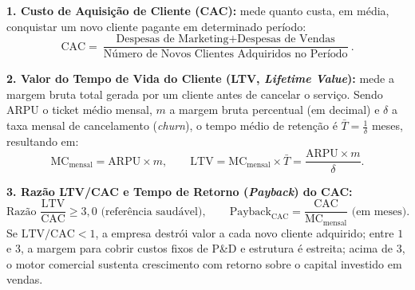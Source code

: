 \begin{boxFormula}
  \textbf{1. Custo de Aquisição de Cliente (CAC):} mede quanto custa, em média, conquistar um novo cliente pagante em determinado período:
  \[
    \text{CAC} = \frac{\text{Despesas de Marketing} + \text{Despesas de Vendas}}{\text{Número de Novos Clientes Adquiridos no Período}}.
  \]

  \textbf{2. Valor do Tempo de Vida do Cliente (LTV, \textit{Lifetime Value}):} mede a margem bruta total gerada por um cliente antes de cancelar o serviço. Sendo $\text{ARPU}$ o ticket médio mensal, $m$ a margem bruta percentual (em decimal) e $\delta$ a taxa mensal de cancelamento (\textit{churn}), o tempo médio de retenção é $\bar{T} = \frac{1}{\delta}$ meses, resultando em:
  \[
    \text{MC}_{\text{mensal}} = \text{ARPU} \times m, \qquad
    \text{LTV} = \text{MC}_{\text{mensal}} \times \bar{T} = \frac{\text{ARPU} \times m}{\delta}.
  \]

  \textbf{3. Razão LTV/CAC e Tempo de Retorno (\textit{Payback}) do CAC:}
  \[
    \text{Razão } \frac{\text{LTV}}{\text{CAC}} \ge 3{,}0 \text{ (referência saudável)}, \qquad
    \text{Payback}_{\text{CAC}} = \frac{\text{CAC}}{\text{MC}_{\text{mensal}}} \text{ (em meses)}.
  \]
  Se $\text{LTV}/\text{CAC} < 1$, a empresa destrói valor a cada novo cliente adquirido; entre $1$ e $3$, a margem para cobrir custos fixos de P\&D e estrutura é estreita; acima de $3$, o motor comercial sustenta crescimento com retorno sobre o capital investido em vendas.
\end{boxFormula}


